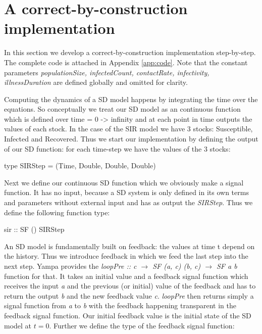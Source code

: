 \section{A correct-by-construction implementation}
\label{sec:impl}

In this section we develop a correct-by-construction implementation step-by-step. The complete code is attached in Appendix \ref{app:code}. Note that the constant parameters \textit{populationSize, infectedCount, contactRate, infectivity, illnessDuration} are defined globally and omitted for clarity.

Computing the dynamics of a SD model happens by integrating the time over the equations. So conceptually we treat our SD model as an continuous function which is defined over time = 0 -> infinity and at each point in time outputs the values of each stock. In the case of the SIR model we have 3 stocks: Susceptible, Infected and Recovered. Thus we start our implementation by defining the output of our SD function: for each time-step we have the values of the 3 stocks:

\begin{HaskellCode}
type SIRStep = (Time, Double, Double, Double)
\end{HaskellCode}

Next we define our continuous SD function which we obviously make a signal function. It has no input, because a SD system is only defined in its own terms and parameters without external input and has as output the \textit{SIRStep}. Thus we define the following function type:

\begin{HaskellCode}
sir :: SF () SIRStep
\end{HaskellCode}

An SD model is fundamentally built on feedback: the values at time t depend on the history. Thus we introduce feedback in which we feed the last step into the next step. Yampa provides the \textit{loopPre :: c $\to$ SF (a, c) (b, c) $\to$ SF a b} function for that. It takes an initial value and a feedback signal function which receives the input \textit{a} and the previous (or initial) value of the feedback and has to return the output \textit{b} and the new feedback value \textit{c}. \textit{loopPre} then returns simply a signal function from \textit{a} to \textit{b} with the feedback happening transparent in the feedback signal function. Our initial feedback value is the initial state of the SD model at $t = 0$. Further we define the type of the feedback signal function:

